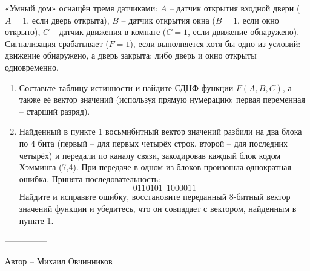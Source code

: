 \question
«Умный дом» оснащён тремя датчиками: $A$ -- датчик открытия входной двери ($A=1$, если дверь открыта), $B$ -- датчик открытия окна ($B=1$, если окно открыто), $C$ -- датчик движения в комнате ($C=1$, если движение обнаружено). Сигнализация срабатывает ($F=1$), если выполняется хотя бы одно из условий: движение обнаружено, а дверь закрыта; либо дверь и окно открыты одновременно.

\begin{enumerate}
\item Составьте таблицу истинности и найдите СДНФ функции $F(A,B,C)$, а также её вектор значений (используя прямую нумерацию: первая переменная -- старший разряд).
\item Найденный в пункте 1 восьмибитный вектор значений разбили на два блока по 4 бита (первый -- для первых четырёх строк, второй -- для последних четырёх) и передали по каналу связи, закодировав каждый блок кодом Хэмминга (7,4). При передаче в одном из блоков произошла однократная ошибка. Принята последовательность:
\[
0110101\ \ 1000011
\]
Найдите и исправьте ошибку, восстановите переданный 8-битный вектор значений функции и убедитесь, что он совпадает с вектором, найденным в пункте 1.
\end{enumerate}
---------------

Автор -- Михаил Овчинников